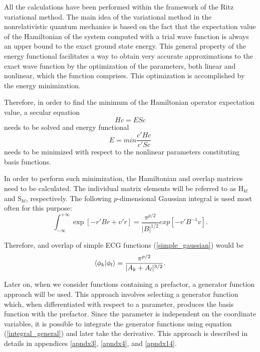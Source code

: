 All the calculations have been performed within the framework of the 
Ritz variational method. 
The main idea of the variational method in the nonrelativistic 
quantum mechanics is based on 
the fact that the expectation value of the Hamiltonian of the system computed with a
trial wave function is always an upper bound to the exact ground state energy. 
This general property of the energy functional facilitates a way to obtain very accurate
approximations to the exact wave function by the optimization of the parameters, 
both linear and nonlinear, which the function comprises. This optimization is accomplished 
by the energy minimization. 

Therefore, in order to find the minimum of the Hamiltonian operator expectation value,
a secular equation 
\begin{equation}
Hc = ESc
\label{secular_equation}
\end{equation}
needs to be solved and energy functional 
\begin{equation}
E = min\frac{c'Hc}{c'Sc}
\label{functional}
\end{equation}
needs to be minimized with respect to the nonlinear parameters 
constituting basis functions.

In order to perform such minimization, the Hamiltonian and overlap matrices need
to be calculated. The individual matrix elements will be referred to as H$_{kl}$
and S$_{kl}$, respectively. The following $p$-dimensional Gaussian integral is used 
most often for this purpose:
\begin{equation}
\int_{-\infty}^{+\infty} \exp \left[ - r'Br + v'r \right] = 
\frac{\pi^{p/2}}{|B|^{1/2}} exp [-v'B^{-1}v].
\label{integral_general}
\end{equation}

Therefore, and overlap of simple ECG functions (\ref{simple_gaussian}) would be
\begin{equation}
\bra{\phi_k}\ket{\phi_l} = 
\frac{\pi^{p/2}}{|A_{k}+A_{l}|^{3/2}}.
\end{equation}

Later on, when we consider functions containing a prefactor, 
a generator function approach will be used. This approach involves
selecting a generator function which, when differentiated with respect to a 
parameter, produces the basis function with the prefactor. Since the parameter is 
independent on the coordinate variables, it is possible to integrate 
the generator functions using equation (\ref{integral_general}) and 
later take the derivative. This approach is described in details in
appendices \ref{apndx3}, \ref{apndx4}, and \ref{apndx14}.

